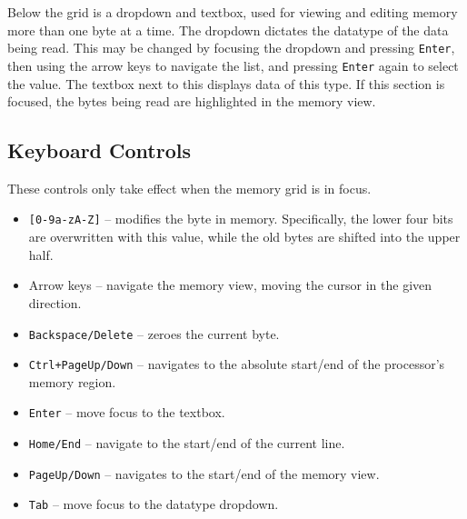 \documentclass[10pt]{article}
\begin{document}
    Below the grid is a dropdown and textbox, used for viewing and editing memory more than one byte at a time.
    The dropdown dictates the datatype of the data being read.
    This may be changed by focusing the dropdown and pressing \texttt{Enter}, then using the arrow keys to navigate the list, and pressing \texttt{Enter} again to select the value.
    The textbox next to this displays data of this type.
    If this section is focused, the bytes being read are highlighted in the memory view.

    \subsection{Keyboard Controls}

    These controls only take effect when the memory grid is in focus.

    \begin{itemize}
        \item \texttt{[0-9a-zA-Z]} -- modifies the byte in memory.
        Specifically, the lower four bits are overwritten with this value, while the old bytes are shifted into the upper half.
        \item Arrow keys -- navigate the memory view, moving the cursor in the given direction.
        \item \texttt{Backspace/Delete} -- zeroes the current byte.
        \item \texttt{Ctrl+PageUp/Down} -- navigates to the absolute start/end of the processor's memory region.
        \item \texttt{Enter} -- move focus to the textbox.
        \item \texttt{Home/End} -- navigate to the start/end of the current line.
        \item \texttt{PageUp/Down} -- navigates to the start/end of the memory view.
        \item \texttt{Tab} -- move focus to the datatype dropdown.
    \end{itemize}
\end{document}
